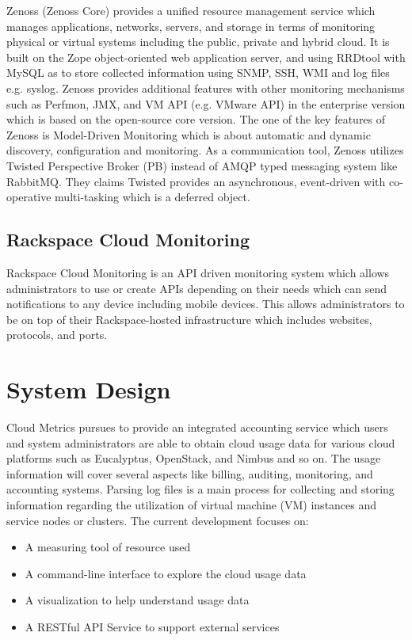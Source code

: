 \documentclass{sig-alternate}
\begin{document}
Zenoss (Zenoss Core) provides a unified resource management service which manages applications, networks, servers, and storage in terms of monitoring physical or virtual systems including the public, private and hybrid cloud. It is built on the Zope object-oriented web application server, and using RRDtool with MySQL as to store collected information using SNMP, SSH, WMI and log files e.g. syslog. Zenoss provides additional features with other monitoring mechanisms such as Perfmon, JMX, and VM API (e.g. VMware API) in the enterprise version which is based on the open-source core version. The one of the key features of Zenoss is Model-Driven Monitoring which is about automatic and dynamic discovery, configuration and monitoring. As a communication tool, Zenoss utilizes Twisted Perspective Broker (PB) instead of AMQP typed messaging system like RabbitMQ. They claims Twisted provides an asynchronous, event-driven with co-operative multi-tasking which is a deferred object.

\subsection{Rackspace Cloud Monitoring}

Rackspace Cloud Monitoring is an API driven monitoring system which allows administrators to use or create APIs depending on their needs which can send notifications to any device including mobile devices. This allows administrators to be on top of their Rackspace-hosted infrastructure which includes websites, protocols, and ports.

\section{System Design} \label{S:design}

Cloud Metrics pursues to provide an integrated accounting service which users and system administrators are able to obtain cloud usage data for various cloud platforms such as Eucalyptus, OpenStack, and Nimbus and so on. The usage information will cover several aspects like billing, auditing, monitoring, and accounting systems. Parsing log files is a main process for collecting and storing information regarding the utilization of virtual machine (VM) instances and service nodes or clusters. The current development focuses on:

\begin{itemize}
 \item A measuring tool of resource used
 \item A command-line interface to explore the cloud usage data
 \item A visualization to help understand usage data
 \item A RESTful API Service to support external services
\end{itemize}
\end{document}
